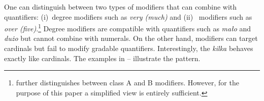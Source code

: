 \documentclass[output=paper, newtxmath, colorlinks, citecolor=brown]{langsci/langscibook}
\begin{document}
	One can distinguish between two types of modifiers that can combine with quantifiers: (i)~degree modifiers such as \textit{very (much)} and (ii)~ modifiers such as \textit{over (five)}.\footnote{\cite{nouwen2010two} further distinguishes between class A and B  modifiers. However, for the purpose of this paper a simplified view is entirely sufficient.} Degree modifiers are compatible with quantifiers such as \textit{mało} and \textit{dużo} but cannot combine with  numerals. On the other hand,  modifiers can target cardinals but fail to modify gradable quantifiers. Interestingly, the   \textit{kilka} behaves exactly like cardinals. The examples in -- illustrate the pattern.
	\vspace{2cm}
\end{document}
